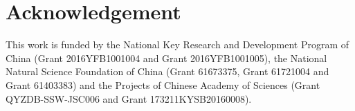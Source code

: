 \documentclass[10pt,twocolumn,letterpaper]{article}
\begin{document}
\section*{Acknowledgement}
This work is funded by the National Key Research and Development Program of China (Grant 2016YFB1001004 and Grant 2016YFB1001005), the National Natural Science Foundation of China (Grant 61673375, Grant 61721004 and Grant 61403383) and the Projects of Chinese Academy of Sciences (Grant QYZDB-SSW-JSC006 and Grant 173211KYSB20160008).

{\small


}
\end{document}
